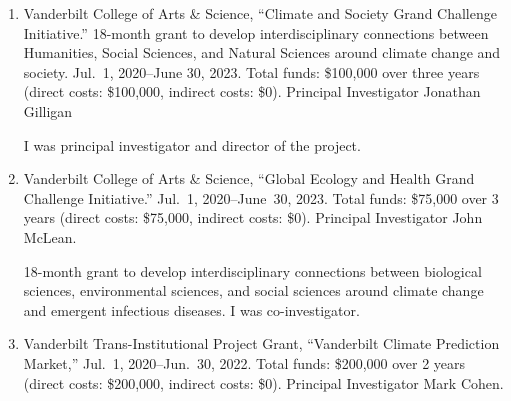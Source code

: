 \begin{enumerate}
\begin{credit}
\end{credit}
%
\item Vanderbilt College of Arts \& Science,
``Climate and Society Grand Challenge Initiative.''
18-month grant to develop interdisciplinary connections between Humanities, Social Sciences, and Natural Sciences around climate change and society.
Jul.~1, 2020--June 30, 2023.
Total funds: \$100,000 over three years (direct costs: \$100,000,
indirect costs: \$0).
Principal Investigator Jonathan Gilligan
\begin{credit}
	I was principal investigator and director of the project.
\end{credit}
%
%
\item Vanderbilt College of Arts \& Science,
``Global Ecology and Health Grand Challenge Initiative.''
Jul.~1, 2020--June~30, 2023.
Total funds: \$75,000 over 3 years (direct costs: \$75,000, indirect costs: \$0).
Principal Investigator John McLean.
\begin{credit}
	18-month grant to develop interdisciplinary connections between biological sciences, environmental sciences, and social sciences around climate change and emergent infectious diseases.
	I was co-investigator.
\end{credit}
%
\item Vanderbilt Trans-Institutional Project Grant,
``Vanderbilt Climate Prediction Market,''
Jul.~1, 2020--Jun.~30, 2022.
Total funds: \$200,000 over 2 years (direct costs: \$200,000, indirect costs: \$0).
Principal Investigator Mark Cohen.


\end{enumerate}
